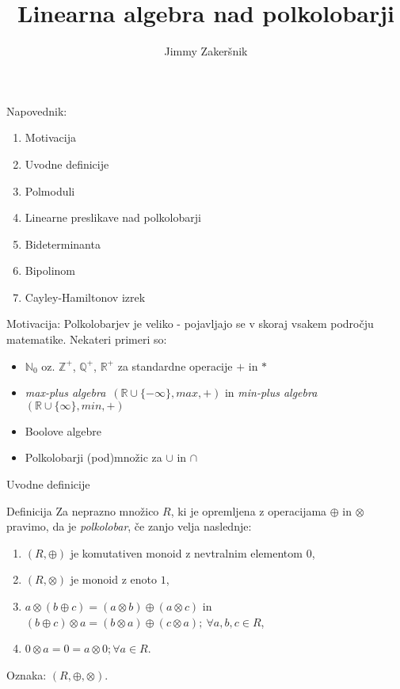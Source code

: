 \documentclass[t, 12pt]{beamer} %
\title{Linearna algebra nad polkolobarji}
\author{Jimmy Zakeršnik}
\institute{mentor: prof. dr. Tomaž Košir}
\newcommand{\mth}[1]{\ensuremath{\mathbb{#1}}}
\newcommand{\R}{\mth{R}}
\newcommand{\Pplus}[1]{\mth{#1}^{+}}
\newcommand{\No}{\mth{N}_0}
\newcommand{\pojem}[1]{\emph{#1}}
\newcommand{\fillblack}[1]{
\begin{tikzpicture}[remember picture, overlay]
    \node [shift={(0 cm,0cm)}]  at (current page.south west)
        {%
        \begin{tikzpicture}[remember picture, overlay] at (current page.south west)
            \draw [fill=black] (0, 0) -- (0,#1 \paperheight) --
                              (\paperwidth,#1 \paperheight) -- (\paperwidth,0) -- cycle ;
        \end{tikzpicture}
        };
        \draw (current page.north west) rectangle (current page.south east);
\end{tikzpicture}
}
\begin{document}
\begin{frame}
  \maketitle
\end{frame}

\begin{frame}{Napovednik:}
	\begin{enumerate}
		\item Motivacija
		\item Uvodne definicije
		\item Polmoduli
		\item Linearne preslikave nad polkolobarji
		\item Bideterminanta
		\item Bipolinom
		\item Cayley-Hamiltonov izrek
	\end{enumerate}

\end{frame}

\begin{frame}{Motivacija:}
  Polkolobarjev je veliko - pojavljajo se v skoraj vsakem področju matematike. Nekateri primeri so:
  \begin{itemize}
    \item $\No$ oz. $\Pplus{Z}$, $\Pplus{Q}$, $\Pplus{R}$ za standardne operacije $+$ in $*$
    \item \pojem{max-plus algebra}~$(\R\cup\{-\infty\}, max, +)$ in \pojem{min-plus algebra}~$(\R\cup\{\infty\}, min, +)$
    \item Boolove algebre
    \item Polkolobarji (pod)množic za $\cup$ in $\cap$
  \end{itemize}

\end{frame}

\begin{frame}{Uvodne definicije}
	
	\begin{block}{Definicija}
	Za neprazno množico $R$, ki je opremljena z operacijama $\oplus$ in $\otimes$ pravimo, da je \pojem{polkolobar}, če zanjo velja naslednje:
		\begin{enumerate}
			\item $(R, \oplus)$ je komutativen monoid z nevtralnim elementom $0$,
			\item $(R, \otimes)$ je monoid z enoto $1$,
			\item $a\otimes(b \oplus c) = (a\otimes b) \oplus (a\otimes c)$ in $(b \oplus c)\otimes a = (b\otimes a) \oplus (c\otimes a);~\forall a, b, c\in R$,
			\item $0 \otimes a = 0 = a\otimes 0; \forall a\in R$.
		\end{enumerate}
	Oznaka: $(R, \oplus, \otimes)$.
	\end{block}

\end{frame}
\end{document}
